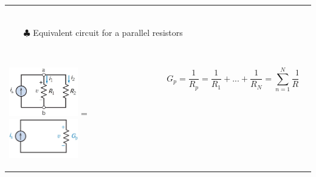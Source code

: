 \documentclass[aspectratio=169]{beamer}
\begin{document}
\begin{frame}[fragile]
\begin{tabular}{ll}
\begin{columns}
\begin{column}{0.5\textwidth}
				\end{column}
			\end{columns}
		\\
			\begin{columns}[c]
				\column{1\textwidth}
				\begin{itemize}
					\item[$\clubsuit$] Equivalent circuit for a parallel resistors
				\end{itemize}
			\end{columns}	
		 \\
			\begin{columns}
				\begin{column}{0.5\textwidth}  %
     						\includegraphics[width=3cm]{figura10.JPG}
=
						\includegraphics[width=3cm]{figura11.JPG}
				\end{column}
				\begin{column}{0.5\textwidth}  %
    					\begin{equation}
    						 G_{p}=\frac{1 }{R_{p}}=\frac{1 }{R_{1}}+...+\frac{1 }{R_{N}}={\sum_{n=1}^{N} \frac{1}{R_{n}}}
					\end{equation}
					
				\end{column}
			\end{columns}	
		
   		\end{tabular}
\end{frame}
\end{document}
